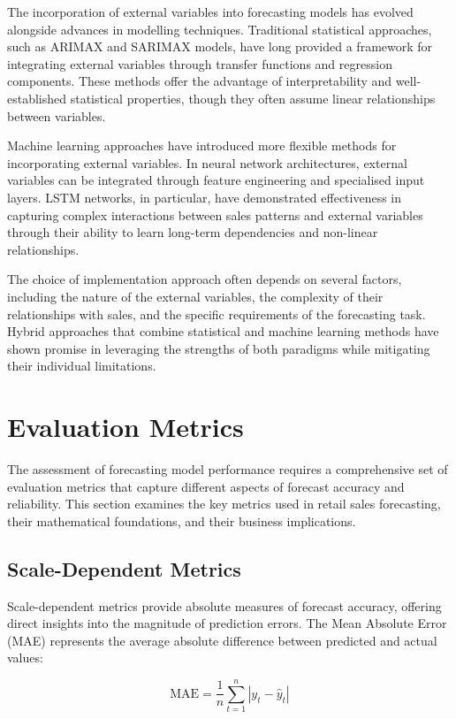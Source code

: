 \documentclass[12pt,a4paper]{report}
\begin{document}
The incorporation of external variables into forecasting models has evolved alongside advances in modelling techniques. Traditional statistical approaches, such as ARIMAX and SARIMAX models, have long provided a framework for integrating external variables through transfer functions and regression components. These methods offer the advantage of interpretability and well-established statistical properties, though they often assume linear relationships between variables.

Machine learning approaches have introduced more flexible methods for incorporating external variables. In neural network architectures, external variables can be integrated through feature engineering and specialised input layers. LSTM networks, in particular, have demonstrated effectiveness in capturing complex interactions between sales patterns and external variables through their ability to learn long-term dependencies and non-linear relationships.

The choice of implementation approach often depends on several factors, including the nature of the external variables, the complexity of their relationships with sales, and the specific requirements of the forecasting task. Hybrid approaches that combine statistical and machine learning methods have shown promise in leveraging the strengths of both paradigms while mitigating their individual limitations.

\section{Evaluation Metrics}

The assessment of forecasting model performance requires a comprehensive set of evaluation metrics that capture different aspects of forecast accuracy and reliability. This section examines the key metrics used in retail sales forecasting, their mathematical foundations, and their business implications.

\subsection{Scale-Dependent Metrics}

Scale-dependent metrics provide absolute measures of forecast accuracy, offering direct insights into the magnitude of prediction errors. The Mean Absolute Error (MAE) represents the average absolute difference between predicted and actual values:

\[
\text{MAE} = \frac{1}{n} \sum_{t=1}^{n} |y_t - \hat{y}_t|
\]
\end{document}
